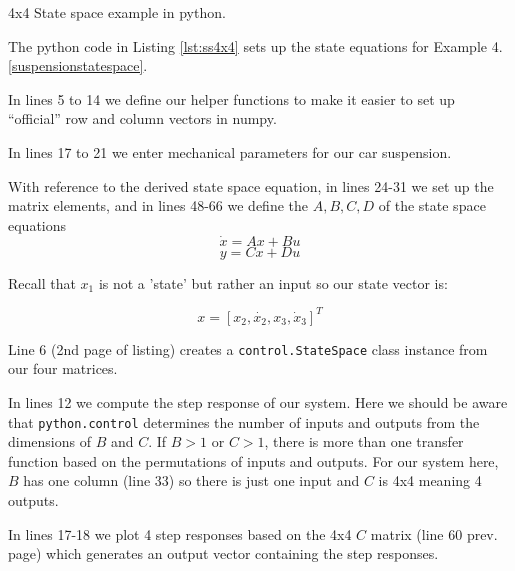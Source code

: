 \begin{Example}
4x4 State space example in python.

The  python code in Listing \ref{lst:ss4x4} sets up the state equations for
Example  4.\ref{suspensionstatespace}.
%


In lines 5 to 14 we define our helper functions to make it easier to set up ``official''
row and column vectors in numpy.

In lines 17 to 21 we enter mechanical parameters for our car suspension.

With reference to the derived state space equation, in lines 24-31 we set
up the matrix elements, and in lines 48-66 we define the $A,B,C,D$ of the
state space equations
\[
\dot{x} = Ax+Bu
\]
\[
y = Cx + Du
\]

Recall that $x_1$ is not a 'state' but rather an input so our state vector is:

\[
x = [x_2,\dot{x_2},x_3,\dot{x}_3]^T
\]

Line 6 (2nd page of listing) creates a {\tt control.StateSpace} class instance from our four matrices.

In lines 12 we compute the step response of our system.   Here we should be aware
that {\tt python.control} determines the number of inputs and outputs from the dimensions of
$B$ and $C$.   If $B>1$ or $C>1$, there is more than one transfer function based on the
permutations of inputs and outputs.   For our system here, $B$ has one column (line 33) so there
is just one input and $C$ is 4x4 meaning 4 outputs.

In lines 17-18 we plot 4 step responses based on the 4x4 $C$ matrix (line 60 prev. page) which generates
an output vector containing the step responses.
\end{Example}

